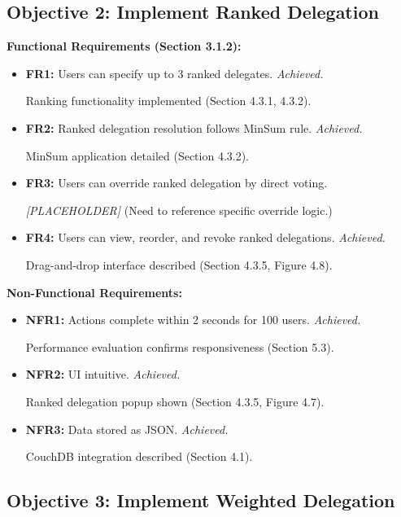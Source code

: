 \subsection{Objective 2: Implement Ranked Delegation}

\textbf{Functional Requirements (Section 3.1.2):}
\begin{itemize}
    \item \textbf{FR1:} Users can specify up to 3 ranked delegates. \textit{Achieved.} 
    
    Ranking functionality implemented (Section 4.3.1, 4.3.2).
    \item \textbf{FR2:} Ranked delegation resolution follows MinSum rule. \textit{Achieved.}
    
    MinSum application detailed (Section 4.3.2).
    \item \textbf{FR3:} Users can override ranked delegation by direct voting.
    
    \textit{[PLACEHOLDER]} (Need to reference specific override logic.)
    \item \textbf{FR4:} Users can view, reorder, and revoke ranked delegations. \textit{Achieved.}
    
    Drag-and-drop interface described (Section 4.3.5, Figure 4.8).
\end{itemize}

\textbf{Non-Functional Requirements:}
\begin{itemize}
    \item \textbf{NFR1:} Actions complete within 2 seconds for 100 users. \textit{Achieved.} 
    
    Performance evaluation confirms responsiveness (Section 5.3).
    \item \textbf{NFR2:} UI intuitive. \textit{Achieved.} 
    
    Ranked delegation popup shown (Section 4.3.5, Figure 4.7).
    \item \textbf{NFR3:} Data stored as JSON. \textit{Achieved.} 
    
    CouchDB integration described (Section 4.1).
\end{itemize}

\subsection{Objective 3: Implement Weighted Delegation}

